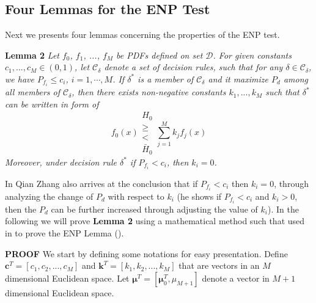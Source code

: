 \subsection{Four Lemmas for the ENP Test}
Next we presents four lemmas concerning the properties of the ENP test.

\newcommand{\bmu}{\boldsymbol{\mu}}
\typeout{}


\noindent \textbf{Lemma 2}
\noindent \textit{
Let $f_0$, $f_1$, ..., $f_M$ be PDFs defined on set $\mathcal{D}$. For given constants $c_1, ..., c_M \in (0, 1)$, let $\mathcal{C}_\delta$ denote a set of decision rules,  such that for any $\delta \in \mathcal{C}_\delta$, we have $P_{f_i} \leq c_i$, $i = 1, \cdots, M$.
If  $\delta^{\ast}$ is a member of $\mathcal{C}_\delta$ and it maximize $P_d$ among all members of $\mathcal{C}_\delta$, then there exists non-negative constants $k_1, ..., k_M$ such that $\delta^\ast$ can be written in form of  
\begin{equation}
f_0(x) \substack{H_0 \\ \geq \\ < \\ \bar{H}_0} \sum_{j=1}^{M}k_jf_j(x)
\end{equation}
Moreover, under decision rule $\delta^\ast$ if  $P_{f_i} < c_i$, then $k_i = 0$. 
}

In \cite{zhang1999design, zhang2000efficient} Qian Zhang also arrives at the conclusion that if $P_{f_i} < c_i$ then $k_i = 0$, through analyzing the change of $P_d$ with respect to $k_i$ (he shows if $P_{f_i} < c_i$ and $k_i > 0$, then the $P_d$ can be further increased through adjusting the value of $k_i$). In the following we will prove \textbf{Lemma 2} using a mathematical method such that used in \cite{LehmannTest, dantzig1951fundamental} to prove the ENP Lemma ().

\noindent\textbf{PROOF}
We start by defining some notations for easy presentation.
Define $\mathbf{c}^T = [c_1, c_2, ..., c_M]$ and  $\mathbf{k}^T = [k_1, k_2, ..., k_M]$ that are vectors in an $M$ dimensional Euclidean  space. Let $\bmu^T = [\bmu_0^T, \mu_{M+1}]$ denote a vector in $M+1$ dimensional Euclidean space. 

